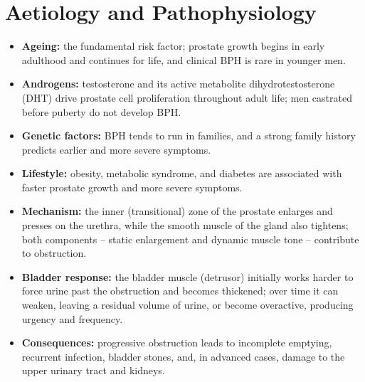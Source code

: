 \section*{Aetiology and Pathophysiology}
\begin{itemize}
    \item \textbf{Ageing:} the fundamental risk factor; prostate growth begins in early adulthood and continues for life, and clinical BPH is rare in younger men.
    \item \textbf{Androgens:} testosterone and its active metabolite dihydrotestosterone (DHT) drive prostate cell proliferation throughout adult life; men castrated before puberty do not develop BPH.
    \item \textbf{Genetic factors:} BPH tends to run in families, and a strong family history predicts earlier and more severe symptoms.
    \item \textbf{Lifestyle:} obesity, metabolic syndrome, and diabetes are associated with faster prostate growth and more severe symptoms.
    \item \textbf{Mechanism:} the inner (transitional) zone of the prostate enlarges and presses on the urethra, while the smooth muscle of the gland also tightens; both components -- static enlargement and dynamic muscle tone -- contribute to obstruction.
    \item \textbf{Bladder response:} the bladder muscle (detrusor) initially works harder to force urine past the obstruction and becomes thickened; over time it can weaken, leaving a residual volume of urine, or become overactive, producing urgency and frequency.
    \item \textbf{Consequences:} progressive obstruction leads to incomplete emptying, recurrent infection, bladder stones, and, in advanced cases, damage to the upper urinary tract and kidneys.
\end{itemize}

